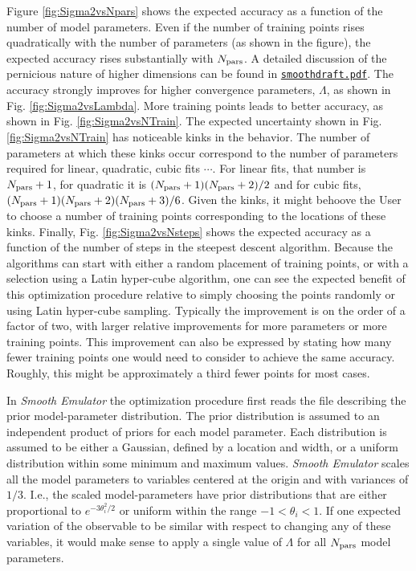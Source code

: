 \documentclass[UserManual.tex]{subfiles}
\begin{document}
Figure \ref{fig:Sigma2vsNpars} shows the expected accuracy as a function of the number of model parameters. Even if the number of training points rises quadratically with the number of parameters (as shown in the figure), the expected accuracy rises substantially with $N_{\rm pars}$. A detailed discussion of the pernicious nature of higher dimensions can be found in  \href{./smoothdraft.pdf}{{\tt smoothdraft.pdf}}. The accuracy strongly improves for higher convergence parameters, $\Lambda$, as shown in Fig. \ref{fig:Sigma2vsLambda}. More training points leads to better accuracy, as shown in Fig. \ref{fig:Sigma2vsNTrain}. The expected uncertainty shown in Fig. \ref{fig:Sigma2vsNTrain} has noticeable kinks in the behavior. The number of parameters at which these kinks occur correspond to the number of parameters required for linear, quadratic, cubic fits $\cdots$. For linear fits, that number is $N_{\rm pars}+1$, for quadratic it is $(N_{\rm pars}+1)(N_{\rm pars}+2)/2$ and for cubic fits, $(N_{\rm pars}+1)(N_{\rm pars}+2)(N_{\rm pars}+3)/6$. Given the kinks, it might behoove the User to choose a number of training points corresponding to the locations of these kinks. Finally, Fig. \ref{fig:Sigma2vsNsteps} shows the expected accuracy as a function of the number of steps in the steepest descent algorithm. Because the algorithms can start with either a random placement of training points, or with a selection using a Latin hyper-cube algorithm, one can see the expected benefit of this optimization procedure relative to simply choosing the points randomly or using Latin hyper-cube sampling. Typically the improvement is on the order of a factor of two, with larger relative improvements for more parameters or more training points. This improvement can also be expressed by stating how many fewer training points one would need to consider to achieve the same accuracy. Roughly, this might be approximately a third fewer points for most cases.

In {\it Smooth Emulator} the optimization procedure first reads the file describing the prior model-parameter distribution. The prior distribution is assumed to an independent product of priors for each model parameter. Each distribution is assumed to be either a Gaussian, defined by a location and width, or a uniform distribution within some minimum and maximum values. {\it Smooth Emulator} scales all the model parameters to variables centered at the origin and with variances of $1/3$. I.e., the scaled model-parameters have prior distributions that are either proportional to $e^{-3\theta_i^2/2}$ or uniform within the range $-1<\theta_i<1$. If one expected variation of the observable to be similar with respect to changing any of these variables, it would make sense to apply a single value of $\Lambda$ for all $N_{\rm pars}$ model parameters.
\end{document}
